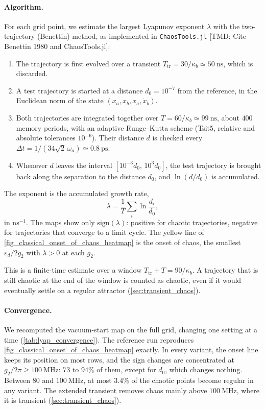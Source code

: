 \documentclass[aps,prx,reprint,floatfix,amsmath,amssymb,longbibliography]{revtex4-2}
\newcommand{\eps}{\varepsilon}
\newcommand{\TMD}[1]{{\color{Blue} [TMD: {#1}]}}
\begin{document}
\paragraph*{Algorithm.}
For each grid point, we estimate the largest Lyapunov exponent $\lambda$ with the two-trajectory (Benettin) method, as implemented in \texttt{ChaosTools.jl} \TMD{Cite Benettin 1980 and ChaosTools.jl}:
\begin{enumerate}
    \item The trajectory is first evolved over a transient $T_\text{tr}=30/\kappa_b\simeq50~\mathrm{ns}$, which is discarded.
    \item A test trajectory is started at a distance $d_0=10^{-7}$ from the reference, in the Euclidean norm of the state $(x_a,x_b,\dot x_a,\dot x_b)$.
    \item Both trajectories are integrated together over $T=60/\kappa_b\simeq99~\mathrm{ns}$, about $400$ memory periods, with an adaptive Runge--Kutta scheme (Tsit5, relative and absolute tolerances $10^{-6}$). Their distance $d$ is checked every $\Delta t=1/(34\sqrt2\,\omega_a)\simeq0.8~\mathrm{ps}$.
    \item Whenever $d$ leaves the interval $[10^{-3}d_0,\,10^{3}d_0]$, the test trajectory is brought back along the separation to the distance $d_0$, and $\ln(d/d_0)$ is accumulated.
\end{enumerate}
The exponent is the accumulated growth rate,
\begin{equation}
    \lambda = \frac{1}{T}\sum_i \ln\frac{d_i}{d_0},
\end{equation}
in $\mathrm{ns}^{-1}$. The maps show only $\mathrm{sign}(\lambda)$: positive for chaotic trajectories, negative for trajectories that converge to a limit cycle. The yellow line of \cref{fig_classical_onset_of_chaos_heatmap} is the onset of chaos, the smallest $\eps_d/2g_2$ with $\lambda>0$ at each $g_2$.

This is a finite-time estimate over a window $T_\text{tr}+T=90/\kappa_b$. A trajectory that is still chaotic at the end of the window is counted as chaotic, even if it would eventually settle on a regular attractor (\cref{sec:transient_chaos}).

\paragraph*{Convergence.}
We recomputed the vacuum-start map on the full grid, changing one setting at a time (\cref{tab:lyap_convergence}). The reference run reproduces \cref{fig_classical_onset_of_chaos_heatmap} exactly. In every variant, the onset line keeps its position on most rows, and the sign changes are concentrated at $g_2/2\pi\ge100~\mathrm{MHz}$: $73$ to $94\%$ of them, except for $d_0$, which changes nothing. Between $80$ and $100~\mathrm{MHz}$, at most $3.4\%$ of the chaotic points become regular in any variant. The extended transient removes chaos mainly above $100~\mathrm{MHz}$, where it is transient (\cref{sec:transient_chaos}).
\end{document}
